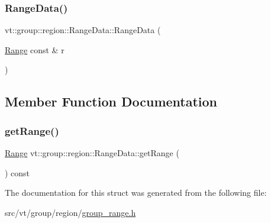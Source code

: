 \mbox{\label{structvt_1_1group_1_1region_1_1_range_data_a9b05605529f68b98c51a425921e038cd}} 
\subsubsection{\texorpdfstring{Range\+Data()}{RangeData()}\hspace{0.1cm}{\footnotesize\ttfamily [2/2]}}
{\footnotesize\ttfamily vt\+::group\+::region\+::\+Range\+Data\+::\+Range\+Data (\begin{DoxyParamCaption}\item[{\hyperlink{structvt_1_1group_1_1region_1_1_range}{Range} const \&}]{r }\end{DoxyParamCaption})\hspace{0.3cm}{\ttfamily [inline]}}



\subsection{Member Function Documentation}
\mbox{\label{structvt_1_1group_1_1region_1_1_range_data_a65d153d9024c2628e6f309abc28e2ffc}} 
\subsubsection{\texorpdfstring{get\+Range()}{getRange()}}
{\footnotesize\ttfamily \hyperlink{structvt_1_1group_1_1region_1_1_range}{Range} vt\+::group\+::region\+::\+Range\+Data\+::get\+Range (\begin{DoxyParamCaption}{ }\end{DoxyParamCaption}) const\hspace{0.3cm}{\ttfamily [inline]}}



The documentation for this struct was generated from the following file\+:\begin{DoxyCompactItemize}
\item 
src/vt/group/region/\hyperlink{group__range_8h}{group\+\_\+range.\+h}\end{DoxyCompactItemize}
